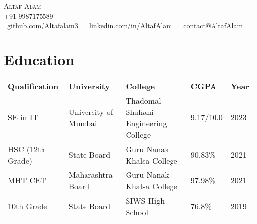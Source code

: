 \documentclass[letterpaper,11pt]{article}
\begin{document}

\begin{center}
    {\huge \scshape Altaf Alam} \\ 
    \vspace{4pt}
    {\scshape +91 9987175589} \\ 
    \vspace{4pt}
    \small
    \faGithub \href{https://github.com/Altafalam3}{\raisebox{-0.2\height}\ github.com/Altafalam3} ~
    \faLinkedin \href{https://linkedin.com/in/altaf-alam-432849234}{\raisebox{-0.2\height}\ linkedin.com/in/AltafAlam} ~
    \faEnvelope \href{mailto:contact@altaf.alam0032@gmail.com}{\raisebox{-0.2\height}\  contact@AltafAlam}
    \vspace{1pt}
\end{center}


\section{Education}
    \vspace{-4pt}
    \begin{itemize}[leftmargin=0.2in, label={}]
        {\item{
            \begin{tabular}{ l@{\hskip 0.2in} l@{\hskip 0.2in} l@{\hskip 0.2in} l@{\hskip 0.2in} l }
                 \textbf{Qualification} & \textbf{University} & \textbf{College} & \textbf{CGPA} & \textbf{Year} \\
                 SE in IT & University of Mumbai & Thadomal Shahani Engineering College & 9.17/10.0 & 2023  \\
                 HSC (12th Grade) & State Board & Guru Nanak Khalsa College & 90.83\% & 2021 \\
                 MHT CET & Maharashtra Board & Guru Nanak Khalsa College & 97.98\% & 2021 \\
                 10th Grade & State Board & SIWS High School & 76.8\% & 2019
            \end{tabular}
        }}
    \end{itemize}
\vspace{-8pt}
\end{document}
